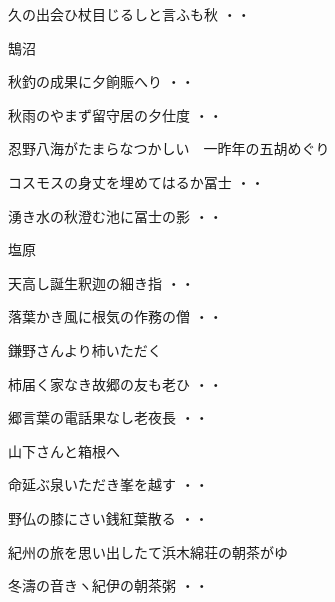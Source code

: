 \begin{shiika}久の出会ひ杖目じるしと言ふも秋
\hfill{・・}\end{shiika}
\vspace{0.6cm}
鵠沼
\begin{shiika}秋釣の成果に夕餉賑へり
\hfill{・・}\end{shiika}
\begin{shiika}秋雨のやまず留守居の夕仕度
\hfill{・・}\end{shiika}
\vspace{0.6cm}
忍野八海がたまらなつかしい　一昨年の五胡めぐり
\begin{shiika}コスモスの身丈を埋めてはるか冨士
\hfill{・・}\end{shiika}
\begin{shiika}湧き水の秋澄む池に冨士の影
\hfill{・・}\end{shiika}
\vspace{0.6cm}
塩原
\begin{shiika}天高し誕生釈迦の細き指
\hfill{・・}\end{shiika}
\begin{shiika}落葉かき風に根気の作務の僧
\hfill{・・}\end{shiika}
\vspace{0.6cm}
鎌野さんより柿いただく
\begin{shiika}柿届く家なき故郷の友も老ひ
\hfill{・・}\end{shiika}
\begin{shiika}郷言葉の電話果なし老夜長
\hfill{・・}\end{shiika}
\vspace{0.6cm}
山下さんと箱根へ
\begin{shiika}命延ぶ泉いただき峯を越す
\hfill{・・}\end{shiika}
\begin{shiika}野仏の膝にさい銭紅葉散る
\hfill{・・}\end{shiika}
\vspace{0.6cm}
紀州の旅を思い出したて浜木綿荘の朝茶がゆ
\begin{shiika}冬濤の音きヽ紀伊の朝茶粥
\hfill{・・}\end{shiika}
